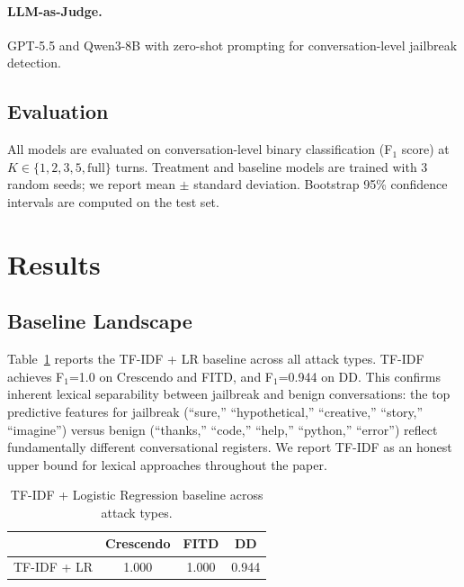 \documentclass[11pt,a4paper]{article}
\newcommand{\fone}{F$_1$}
\begin{document}
\paragraph{LLM-as-Judge.}
GPT-5.5 and Qwen3-8B with zero-shot prompting for conversation-level jailbreak detection.

\subsection{Evaluation}
All models are evaluated on conversation-level binary classification (\fone{} score) at $K \in \{1, 2, 3, 5, \text{full}\}$ turns.
Treatment and baseline models are trained with 3 random seeds; we report mean $\pm$ standard deviation.
Bootstrap 95\% confidence intervals are computed on the test set.

\section{Results}

\subsection{Baseline Landscape}
\label{sec:baselines}

Table~\ref{tab:tfidf} reports the TF-IDF + LR baseline across all attack types.
TF-IDF achieves \fone{}=1.0 on Crescendo and FITD, and \fone{}=0.944 on DD.
This confirms inherent lexical separability between jailbreak and benign conversations: the top predictive features for jailbreak (``sure,'' ``hypothetical,'' ``creative,'' ``story,'' ``imagine'') versus benign (``thanks,'' ``code,'' ``help,'' ``python,'' ``error'') reflect fundamentally different conversational registers.
We report TF-IDF as an honest upper bound for lexical approaches throughout the paper.

\begin{table}[t]
\centering
\caption{TF-IDF + Logistic Regression baseline across attack types.}
\label{tab:tfidf}
\begin{tabular}{lccc}
\toprule
 & Crescendo & FITD & DD \\
\midrule
TF-IDF + LR & 1.000 & 1.000 & 0.944 \\
\bottomrule
\end{tabular}
\end{table}
\end{document}
